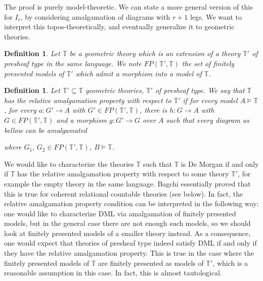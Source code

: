\documentclass{article}
\newtheorem{definition}[theorem]{Definition}
\newcommand{\T}{\mathbb{T}}
\begin{document}
The proof is purely model-theoretic. We can state a more general version of this for $I_r$, by considering amalgamation of diagrams with $r+1$ legs. We want to interpret this topos-theoretically, and eventually generalize it to geometric theories. 


\begin{definition}
    Let $\T$ be a geometric theory which is an extension of a theory $\T'$ of presheaf type in the same language. We note $FP(\T',\T)$ the set of finitely presented models of $\T'$ which admit a morphism into a model of $\T$.
\end{definition}

\begin{definition}\label{relative_amalg}
    Let $\T'\subseteq\T$ geometric theories, $\T'$ of presheaf type. We say that $\T$ has the relative amalgamation property with respect to $\T'$ if for every model $A\models\T$, for every $a:G'\xrightarrow{}A$ with $G'\in FP(\T',\T)$, there is $h:G\xrightarrow{}A$ with $G\in FP(\T',\T)$ and a morphism $g:G'\xrightarrow{}G$ over $A$ such that every diagram as bellow can be amalgamated
    \begin{center}
    \end{center}
    where $G_1,\, G_2\in FP(\T',\T)$, $B\models\T$.
\end{definition}

We would like to characterize the theories $\T$ such that $\T$ is De Morgan if and only if $\T$ has the relative amalgamation property with respect to some theory $\T'$, for example the empty theory in the same language. Bagchi essentially proved that this is true for coherent relational countable theories (see below). In fact, the relative amalgamation property condition can be interpreted in the following way: one would like to characterize DML via amalgamation of finitely presented models, but in the general case there are not enough such models, so we should look at finitely presented models of a smaller theory instead. As a consequence, one would expect that theories of presheaf type indeed satisfy DML if and only if they have the relative amalgamation property. This is true in the case where the finitely presented models of $\T$ are finitely presented as models of $\T'$, which is a reasonable assumption in this case. In fact, this is almost tautological.
\end{document}
